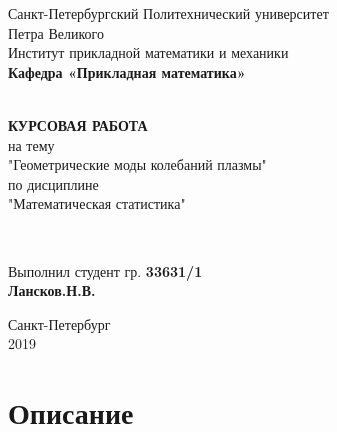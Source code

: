 \documentclass[12pt]{article}
\renewcommand{\listoffigures}{\begingroup  %
\tocsection
\tocfile{\listfigurename}{lof}
\endgroup}
\renewcommand{\listoftables}{\begingroup  %
\tocsection
\tocfile{\listtablename}{lot}
\endgroup}
\begin{document}
\begin{titlepage}
	\center
		Санкт-Петербургский Политехнический 
		университет \\ Петра Великого\\
		Институт прикладной математики и механики
		\\ \textbf{Кафедра «Прикладная математика»}

	\vfill ~
	\textbf{
		\\ \large КУРСОВАЯ РАБОТА
	}
	\\	на тему 
	\\ "Геометрические моды колебаний плазмы"
	\\ по дисциплине
	\\ "Математическая статистика"

	\vfill ~

	Выполнил студент гр. \textbf{33631/1} \\
	\textbf{Лансков.Н.В.} \\ 

\vfill

{\large}	Санкт-Петербург
\\ 2019
\end{titlepage}


\tableofcontents 
\newpage
\listoffigures
\newpage

\section{Описание}
\end{document}
